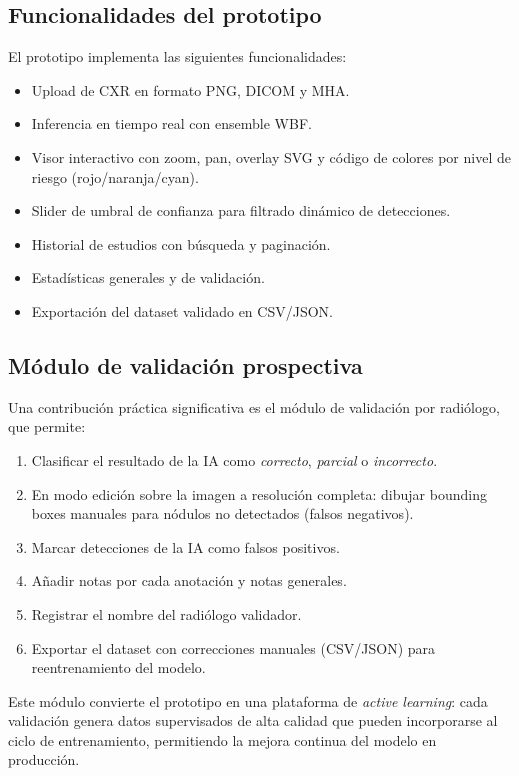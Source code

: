 \documentclass[conference]{IEEEtran}
\begin{document}
\subsection{Funcionalidades del prototipo}

El prototipo implementa las siguientes funcionalidades:

\begin{itemize}
    \item Upload de CXR en formato PNG, DICOM y MHA.
    \item Inferencia en tiempo real con ensemble WBF.
    \item Visor interactivo con zoom, pan, overlay SVG y código de colores por nivel de riesgo (rojo/naranja/cyan).
    \item Slider de umbral de confianza para filtrado dinámico de detecciones.
    \item Historial de estudios con búsqueda y paginación.
    \item Estadísticas generales y de validación.
    \item Exportación del dataset validado en CSV/JSON.
\end{itemize}

\subsection{Módulo de validación prospectiva}

Una contribución práctica significativa es el módulo de validación por radiólogo, que permite:

\begin{enumerate}
    \item Clasificar el resultado de la IA como \textit{correcto}, \textit{parcial} o \textit{incorrecto}.
    \item En modo edición sobre la imagen a resolución completa: dibujar bounding boxes manuales para nódulos no detectados (falsos negativos).
    \item Marcar detecciones de la IA como falsos positivos.
    \item Añadir notas por cada anotación y notas generales.
    \item Registrar el nombre del radiólogo validador.
    \item Exportar el dataset con correcciones manuales (CSV/JSON) para reentrenamiento del modelo.
\end{enumerate}

Este módulo convierte el prototipo en una plataforma de \textit{active learning}: cada validación genera datos supervisados de alta calidad que pueden incorporarse al ciclo de entrenamiento, permitiendo la mejora continua del modelo en producción.
\end{document}
